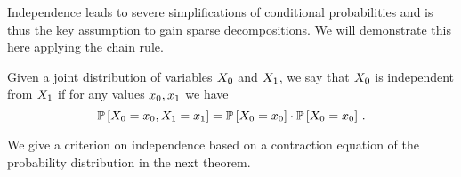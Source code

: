 
Independence leads to severe simplifications of conditional probabilities and is thus the key assumption to gain sparse decompositions.
We will demonstrate this here applying the chain rule.

\begin{definition}[Independence]\label{def:independence}
	Given a joint distribution of variables $X_{0}$ and $X_{1}$, we say that $X_{0}$ is independent from $X_{1}$ if for any values $x_{0},x_{1}$ we have
		\[ \mathbb{P}\left[X_{0}=x_{0},X_{1}=x_{1}\right] 
		= \mathbb{P}\left[X_{0}=x_{0}\right]
		 \cdot 
		 \mathbb{P}\left[X_{0}=x_{0}\right] \, . \]
\end{definition}

We give a criterion on independence based on a contraction equation of the probability distribution in the next theorem.

